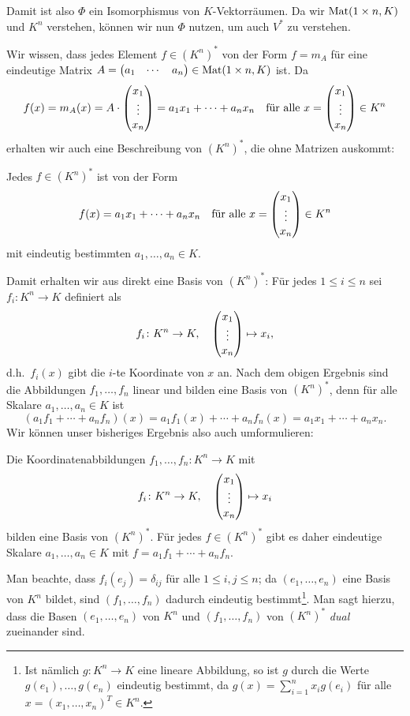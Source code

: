 \documentclass[a4paper,10pt]{article}
\begin{document}
Damit ist also $\Phi$ ein Isomorphismus von $K$-Vektorräumen. Da wir $\mathrm{Mat}(1 \times n, K)$ und $K^n$ verstehen, können wir nun $\Phi$ nutzen, um auch $V^*$ zu verstehen.

Wir wissen, dass jedes Element $f \in (K^n)^*$ von der Form $f = m_A$ für eine eindeutige Matrix $A = \begin{pmatrix} a_1 & \cdots & a_n \end{pmatrix} \in \mathrm{Mat}(1 \times n, K)$ ist. Da
\[
 f(x)
 = m_A(x)
 = A \cdot \begin{pmatrix} x_1 \\ \vdots \\ x_n \end{pmatrix}
 = a_1 x_1 + \dotsb + a_n x_n
 \quad
 \text{für alle $x = \begin{pmatrix} x_1 \\ \vdots \\ x_n \end{pmatrix} \in K^n$}
\]
erhalten wir auch eine Beschreibung von $(K^n)^*$, die ohne Matrizen auskommt:


\begin{shaded}
 Jedes $f \in (K^n)^*$ ist von der Form
 \[
  f(x) = a_1 x_1 + \dotsb + a_n x_n
  \quad
  \text{für alle $x = \begin{pmatrix} x_1 \\ \vdots \\ x_n \end{pmatrix} \in K^n$}
 \]
 mit eindeutig bestimmten $a_1, \dotsc, a_n \in K$.
\end{shaded}

Damit erhalten wir aus direkt eine Basis von $(K^n)^*$: Für jedes $1 \leq i \leq n$ sei $f_i \colon K^n \to K$ definiert als
\[
 f_i \colon K^n \to K, \quad \begin{pmatrix} x_1 \\ \vdots \\ x_n \end{pmatrix} \mapsto x_i,
\]
d.h.\ $f_i(x)$ gibt die $i$-te Koordinate von $x$ an. Nach dem obigen Ergebnis sind die Abbildungen $f_1, \dotsc, f_n$ linear und bilden eine Basis von $(K^n)^*$, denn für alle Skalare $a_1, \dotsc, a_n \in K$ ist
\[
 (a_1 f_1 + \dotsb + a_n f_n)(x)
 = a_1 f_1(x) + \dotsb + a_n f_n(x)
 = a_1 x_1 + \dotsb + a_n x_n.
\]
Wir können unser bisheriges Ergebnis also auch umformulieren:

\begin{shaded}
 Die Koordinatenabbildungen $f_1, \dotsc, f_n \colon K^n \to K$ mit
 \[
  f_i \colon K^n \to K, \quad \begin{pmatrix} x_1 \\ \vdots \\ x_n \end{pmatrix} \mapsto x_i
 \]
 bilden eine Basis von $(K^n)^*$. Für jedes $f \in (K^n)^*$ gibt es daher eindeutige Skalare $a_1, \dotsc, a_n \in K$ mit $f = a_1 f_1 + \dotsb + a_n f_n$.
\end{shaded}

Man beachte, dass $f_i(e_j) = \delta_{ij}$ für alle $1 \leq i,j \leq n$; da $(e_1, \dotsc, e_n)$ eine Basis von $K^n$ bildet, sind $(f_1, \dotsc, f_n)$ dadurch eindeutig bestimmt\footnote{Ist nämlich $g \colon K^n \to K$ eine lineare Abbildung, so ist $g$ durch die Werte $g(e_1), \dotsc, g(e_n)$ eindeutig bestimmt, da $g(x) = \sum_{i=1}^n x_i g(e_i)$ für alle $x = (x_1, \dotsc, x_n)^T \in K^n$.}.  Man sagt hierzu, dass die Basen $(e_1, \dotsc, e_n)$ von $K^n$ und $(f_1, \dotsc, f_n)$ von $(K^n)^*$ \emph{dual} zueinander sind.
\end{document}
